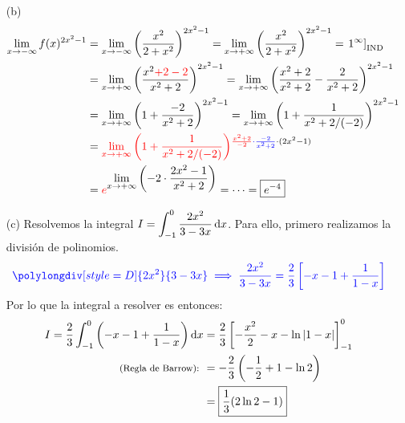 \begin{enumerate}
    \item[(b)] 
    \begin{equation*}
        \begin{split}
            \lim_{x\to -\infty } f(x)^{2x^2-1}&=\lim_{x\to -\infty } \left ( \frac{x^2}{2+x^2} \right )^{2x^2-1}=\lim_{x\to +\infty }\left ( \frac{x^2}{2+x^2} \right )^{2x^2-1}=\left . 1^\infty  \right ]_{\text{IND}}\\
            &=\lim_{x\to +\infty } \left ( \frac{x^2 \textcolor{red}{+2-2}}{x^2+2} \right )^{2x^2-1}=\lim_{x\to +\infty } \left ( \frac{x^2+2}{x^2+2}-\frac{2}{x^2+2} \right )^{2x^2-1}\\
            &=\lim_{x\to +\infty }\left ( 1+\frac{-2}{x^2+2} \right )^{2x^2-1}=\lim_{x\to +\infty }\left ( 1+\frac{1}{x^2+2/(-2)} \right )^{2x^2-1}\\
            &=\textcolor{red}{\lim_{x\to +\infty }\left ( 1+\frac{1}{x^2+2/(-2)} \right )}^{\textcolor{red}{\frac{x^2+2}{-2}}\textcolor{blue}{\cdot \frac{-2}{x^2+2}}\cdot (2x^2-1)}\\
            &=\textcolor{red}{e}^{\displaystyle{\lim_{x\to +\infty }} \left ( -2\cdot \frac{2x^2-1}{x^2+2} \right )}=\cdots =\boxed{e^{-4}}
        \end{split}
    \end{equation*}

    \item[(c)] Resolvemos la integral $I=\displaystyle{\int _{-1}^0 \frac{2x^2}{3-3x} \odif{x}} $. Para ello, primero realizamos la división de polinomios.
    \begin{equation*}
        \begin{split}
            \textcolor{blue}{\polylongdiv[style=D]{2x^2}{3-3x}\implies \frac{2x^2}{3-3x}=\frac{2}{3}\left [ -x-1+\frac{1}{1-x} \right ]}
        \end{split}
    \end{equation*}
    Por lo que la integral a resolver es entonces:
    \begin{equation*}
        \begin{split}
            I=\frac{2}{3}\int _{-1}^0 \left ( -x-1+\frac{1}{1-x} \right ) \odif{x}&=\frac{2}{3} \left [ -\frac{x^2}{2}-x-\ln |1-x| \right ]_{-1}^0\\
            \text{\footnotesize (Regla de Barrow): }&=-\frac{2}{3} \left ( -\frac{1}{2}+1-\ln2 \right )\\
            &=\boxed{\frac{1}{3}(2\ln 2-1)}
        \end{split}
    \end{equation*}


\end{enumerate}
